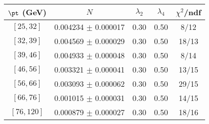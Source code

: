\begin{tabular}{c||c|c|c|c}
$\pt$ (GeV) & $N$ & $\lambda_{2}$ & $\lambda_4$  & $\chi^2$/ndf  \\
\hline
$[25, 32]$ & 0.004234 $\pm$ 0.000017 & 0.30 & 0.50 & 8/12\\
$[32, 39]$ & 0.004569 $\pm$ 0.000029 & 0.30 & 0.50 & 18/13\\
$[39, 46]$ & 0.004933 $\pm$ 0.000048 & 0.30 & 0.50 & 8/14\\
$[46, 56]$ & 0.003321 $\pm$ 0.000041 & 0.30 & 0.50 & 13/15\\
$[56, 66]$ & 0.003093 $\pm$ 0.000062 & 0.30 & 0.50 & 29/15\\
$[66, 76]$ & 0.001015 $\pm$ 0.000031 & 0.30 & 0.50 & 14/15\\
$[76, 120]$ & 0.000879 $\pm$ 0.000027 & 0.30 & 0.50 & 18/16\\
\end{tabular}
